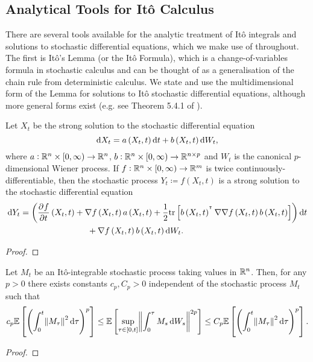 \subsection{Analytical Tools for It\^o Calculus}
There are several tools available for the analytic treatment of It\^o integrals and solutions to stochastic differential equations, which we make use of throughout.
The first is It\^o's Lemma (or the It\^o Formula), which is a change-of-variables formula in stochastic calculus and can be thought of as a generalisation of the chain rule from deterministic calculus.
We state and use the multidimensional form of the Lemma for solutions to It\^o stochastic differential equations, although more general forms exist (e.g. see Theorem 5.4.1 of \cite{Bremaud_2020_ProbabilityTheoryStochastic}).
\begin{theorem}[It\^o's Lemma]
	Let \(X_t\) be the strong solution to the stochastic differential equation
	\[
		\dif X_t = a\left(X_t, t\right)\dif t + b\left(X_t, t\right)\dif W_t,
	\]
	where \(a: \mathbb{R}^n \times [0,\infty) \to \mathbb{R}^n\), \(b: \mathbb{R}^n \times [0,\infty) \to \mathbb{R}^{n\times p}\) and \(W_t\) is the canonical \(p\)-dimensional Wiener process.
	If \(f: \mathbb{R}^n \times [0, \infty) \to \mathbb{R}^m\) is twice continuously-differentiable, then the stochastic process \(Y_t \coloneqq f\left(X_t, t\right)\) is a strong solution to the stochastic differential equation
	\begin{align*}
		\dif Y_t & = \left(\dpd{f}{t}\left(X_t, t\right) + \nabla f\left(X_t, t\right) a\left(X_t, t\right) + \frac12\mathrm{tr}\left[b\left(X_t, t\right)^{\T} \nabla\nabla f\left(X_t, t\right) b\left(X_t, t\right)\right] \right)\dif t \\
		         & \qquad\qquad\qquad\qquad + \nabla f\left(X_t, t\right)b\left(X_t, t\right) \dif W_t.
	\end{align*}
\end{theorem}
\begin{proof}

\end{proof}



\begin{theorem}
	Let \(M_t\) be an It\^o-integrable stochastic process taking values in \(\mathbb{R}^n\).
	Then, for any \(p > 0\) there exists constants \(c_p, C_p > 0\) independent of the stochastic process \(M_t\) such that
	\[
		c_p\avg{\left(\int_0^t{\norm{M_\tau}^2\dif \tau}\right)^p} \leq \avg{\sup_{\tau \in \left[0, t\right]}\norm{\int_0^\tau{M_s\dif W_s}}^{2p}} \leq C_p\avg{\left(\int_0^t{\norm{M_\tau}^2\dif \tau}\right)^p}.
	\]
\end{theorem}
\begin{proof}

\end{proof}





